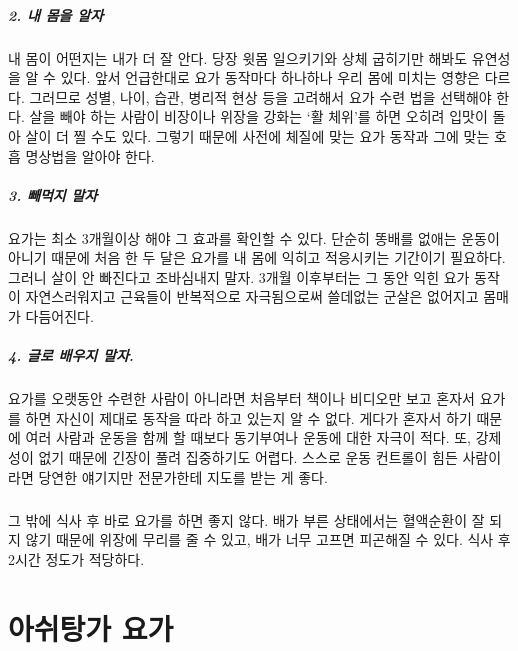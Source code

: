 \documentclass[12pt, a4paper, oneside]{book}
\begin{document}
\paragraph{2. 내 몸을 알자 }
내 몸이 어떤지는 내가 더 잘 안다. 당장 윗몸 일으키기와 상체 굽히기만 해봐도 유연성을 알 수 있다. 앞서 언급한대로 요가 동작마다 하나하나 우리 몸에 미치는 영향은 다르다. 그러므로 성별, 나이, 습관, 병리적 현상 등을 고려해서 요가 수련 법을 선택해야 한다. 살을 빼야 하는 사람이 비장이나 위장을 강화는 ‘활 체위’를 하면 오히려 입맛이 돌아 살이 더 찔 수도 있다. 그렇기 때문에 사전에 체질에 맞는 요가 동작과 그에 맞는 호흡 명상법을 알아야 한다.

\paragraph{3. 빼먹지 말자 }
요가는 최소 3개월이상 해야 그 효과를 확인할 수 있다. 단순히 똥배를 없애는 운동이 아니기 때문에 처음 한 두 달은 요가를 내 몸에 익히고 적응시키는 기간이기 필요하다. 그러니 살이 안 빠진다고 조바심내지 말자. 3개월 이후부터는 그 동안 익힌 요가 동작이 자연스러워지고 근육들이 반복적으로 자극됨으로써 쓸데없는 군살은 없어지고 몸매가 다듬어진다.

\paragraph{4. 글로 배우지 말자. }
요가를 오랫동안 수련한 사람이 아니라면 처음부터 책이나 비디오만 보고 혼자서 요가를 하면 자신이 제대로 동작을 따라 하고 있는지 알 수 없다. 게다가 혼자서 하기 때문에 여러 사람과 운동을 함께 할 때보다 동기부여나 운동에 대한 자극이 적다. 또, 강제성이 없기 때문에 긴장이 풀려 집중하기도 어렵다. 스스로 운동 컨트롤이 힘든 사람이라면 당연한 얘기지만 전문가한테 지도를 받는 게 좋다.

\paragraph{}
그 밖에 식사 후 바로 요가를 하면 좋지 않다. 배가 부른 상태에서는 혈액순환이 잘 되지 않기 때문에 위장에 무리를 줄 수 있고, 배가 너무 고프면 피곤해질 수 있다. 식사 후 2시간 정도가 적당하다.




	\chapter{아쉬탕가 요가}
	\minitoc
\end{document}
